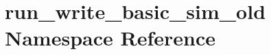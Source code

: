 \hypertarget{namespacerun__write__basic__sim__old}{\section{run\-\_\-write\-\_\-basic\-\_\-sim\-\_\-old Namespace Reference}
\label{namespacerun__write__basic__sim__old}
}
